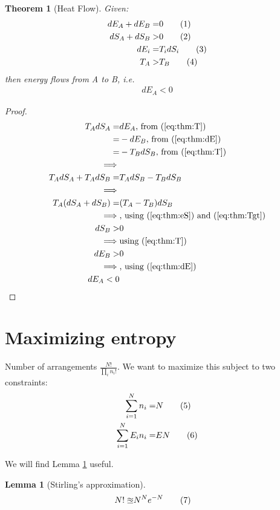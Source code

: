 \documentclass[]{article}
\newcommand\numberthis{\addtocounter{equation}{1}\tag{\theequation}}
\newtheorem{thm}{Theorem}
\newtheorem{lemma}{Lemma}
\begin{document}
\begin{thm}[Heat Flow]\label{thm:heat:flow}
	Given:
	\begin{align*}
	dE_A + dE_B =& 0 \numberthis \label{eq:thm:dE}\\
	dS_A + dS_B>& 0 \numberthis \label{eq:thm:eS} \\
	dE_i =& T_i dS_i \numberthis \label{eq:thm:T} \\
	T_A>&T_B \numberthis \label{eq:thm:Tgt}
	\end{align*}
	then energy flows from A to B, i.e.
	\begin{align*}
	dE_A<0
	\end{align*}
\end{thm}
\begin{proof}
	\begin{align*}
	T_A dS_A =& dE_A \text{, from (\ref{eq:thm:T})}\\
	=& - dE_B \text{, from (\ref{eq:thm:dE})}\\
	=& - T_B dS_B  \text{, from (\ref{eq:thm:T})}\\
	\implies&\\
	T_A dS_A + T_A dS_B =& T_A dS_B -T_B dS_B\\
	\implies&\\
	T_A (dS_A + dS_B) =& (T_A  -T_B) dS_B\\
	\implies& \text{, using (\ref{eq:thm:eS}) and (\ref{eq:thm:Tgt})}\\
	dS_B >& 0\\
	\implies& \text{using (\ref{eq:thm:T})}\\
	dE_B >& 0\\
	\implies& \text{, using (\ref{eq:thm:dE})}\\
	dE_A<0
	\end{align*}
\end{proof}



\section{Maximizing entropy}

Number of arrangements $\frac{N!}{\prod_{i}n_i!}$. We want to maximize this subject to two constraints:
\begin{align*}
\sum_{i=1}^{N} n_i =& N \numberthis\label{eq:sum:probilities}\\
\sum_{i=1}^{N} E_i n_i =& E N \numberthis\label{eq:total:energy}
\end{align*}

We will find Lemma \ref{lemma:Stirling} useful.
\begin{lemma}[Stirling's approximation]\label{lemma:Stirling}
	\begin{align*}
	N! \approxeq& N^N e^{-N}\numberthis\label{eq:stirling}
	\end{align*}
\end{lemma}
\end{document}

